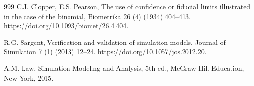 \documentclass[futureinternet,article,submit,moreauthors]{Definitions/mdpi}
\begin{document}
\begin{thebibliography}{999}
C.J. Clopper, E.S. Pearson,
The use of confidence or fiducial limits illustrated in the case of the binomial,
Biometrika 26 (4) (1934) 404--413.
\newblock \url{https://doi.org/10.1093/biomet/26.4.404}.

R.G. Sargent,
Verification and validation of simulation models,
Journal of Simulation 7 (1) (2013) 12--24.
\newblock \url{https://doi.org/10.1057/jos.2012.20}.

A.M. Law,
Simulation Modeling and Analysis, 5th ed.,
McGraw-Hill Education, New York, 2015.

\end{thebibliography}

\PublishersNote{}
\end{document}
